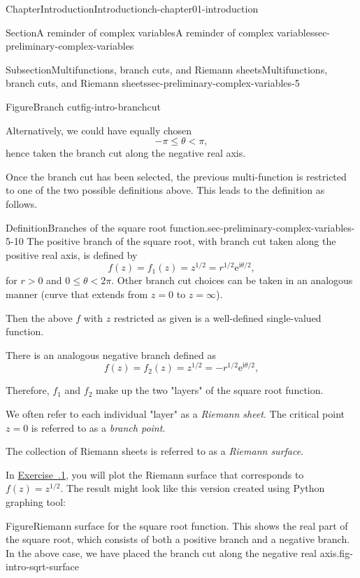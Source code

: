\documentclass[oneside,10pt,]{book}
\newcommand{\xreffont}{\relax}
\numberwithin{equation}{section}
\newcommand{\e}{\mathrm{e}}
\newcommand{\im}{\mathrm{i}}
\begin{document}
\begin{chapterptx}{Chapter}{Introduction}{}{Introduction}{}{}{ch-chapter01-introduction}
\begin{sectionptx}{Section}{A reminder of complex variables}{}{A reminder of complex variables}{}{}{sec-preliminary-complex-variables}
\begin{subsectionptx}{Subsection}{Multifunctions, branch cuts, and Riemann sheets}{}{Multifunctions, branch cuts, and Riemann sheets}{}{}{sec-preliminary-complex-variables-5}
\begin{figureptx}{Figure}{Branch cut}{fig-intro-branchcut}{}
\begin{image}{0.1}{0.8}{0.1}{}
\end{image}%
\tcblower
\end{figureptx}%
Alternatively, we could have equally chosen%
\begin{equation*}
-\pi \leq \theta < \pi,
\end{equation*}
hence taken the branch cut along the negative real axis.%
\par
Once the branch cut has been selected, the previous multi-function is restricted to one of the two possible definitions above. This leads to the definition as follows.%
\begin{definition}{Definition}{Branches of the square root function.}{sec-preliminary-complex-variables-5-10}%
The positive branch of the square root, with branch cut taken along the positive real axis, is defined by%
\begin{equation*}
f(z) = f_1(z) = z^{1/2} = r^{1/2} \e^{\im\theta/2},
\end{equation*}
for \(r > 0 \) and \(0 \leq \theta < 2\pi\). Other branch cut choices can be taken in an analogous manner (curve that extends from \(z= 0\) to \(z = \infty\)).%
\par
Then the above \(f\) with \(z\) restricted as given is a well-defined single-valued function.%
\par
There is an analogous negative branch defined as%
\begin{equation*}
f(z) = f_2(z) = z^{1/2} = -r^{1/2} \e^{\im\theta/2},
\end{equation*}
%
\par
Therefore, \(f_1\) and \(f_2\) make up the two "layers" of the square root function.%
\par
We often refer to each individual "layer" as a \emph{Riemann sheet}. The critical point \(z = 0\) is referred to as a \emph{branch point}.%
\par
The collection of Riemann sheets is referred to as a \emph{Riemann surface}.%
\end{definition}
In \hyperlink{ex-Riemannsurface}{Exercise~{\xreffont 1.3.1}}, you will plot the Riemann surface that corresponds to \(f(z) = z^{1/2}\). The result might look like this version created using Python graphing tool: \begin{figureptx}{Figure}{Riemann surface for the square root function. This shows the real part of the square root, which consists of both a positive branch and a negative branch. In the above case, we have placed the branch cut along the negative real axis.}{fig-intro-sqrt-surface}{}%

\end{figureptx}
\end{subsectionptx}
\end{sectionptx}
\end{chapterptx}
\end{document}
